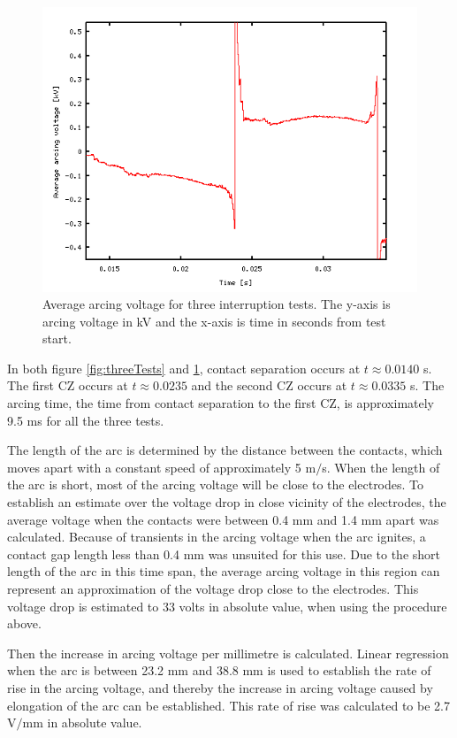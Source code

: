 \documentclass[10pt,b5paper,twoside]{article}
\begin{document}
\begin{figure}[H]
\centering
\includegraphics[scale=0.7]{Bilder/Theory/averageOfthreeTests.png}
\caption{Average arcing voltage for three interruption tests. The y-axis is arcing voltage in kV and the x-axis is time in seconds from test start.} \label{fig:averageArcingVoltage}
\end{figure}

In both figure \ref{fig:threeTests} and \ref{fig:averageArcingVoltage}, contact separation occurs at $t \approx 0.0140$ s. The first CZ occurs at $t \approx 0.0235$ and the second CZ occurs at $t \approx 0.0335$ s. The arcing time, the time from contact separation to the first CZ, is approximately 9.5 ms for all the three tests.

The length of the arc is determined by the distance between the contacts, which moves apart with a constant speed of approximately 5 m$/$s. When the length of the arc is short, most of the arcing voltage will be close to the electrodes. To establish an estimate over the voltage drop in close vicinity of the electrodes, the average voltage when the contacts were between 0.4 mm and 1.4 mm apart was calculated. Because of transients in the arcing voltage when the arc ignites, a contact gap length less than 0.4 mm was unsuited for this use. Due to the short length of the arc in this time span, the average arcing voltage in this region can represent an approximation of the voltage drop close to the electrodes. This voltage drop is estimated to 33 volts in absolute value, when using the procedure above.

Then the increase in arcing voltage per millimetre is calculated. Linear regression when the arc is between 23.2 mm and 38.8 mm is used to establish the rate of rise in the arcing voltage, and thereby the increase in arcing voltage caused by elongation of the arc can be established. This rate of rise was calculated to be 2.7 V$/$mm in absolute value.
\end{document}
